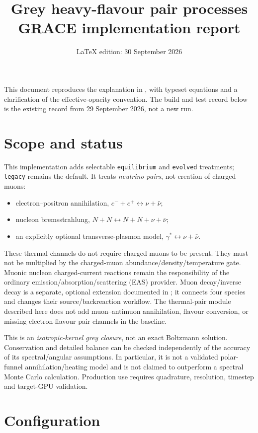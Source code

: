 \documentclass[11pt,a4paper]{article}
\title{Grey heavy-flavour pair processes\\\large GRACE implementation report}
\author{}
\date{LaTeX edition: 30 September 2026}
\newcommand{\code}[1]{\texttt{#1}}
\begin{document}
\maketitle
\noindent This document reproduces the explanation in
, with typeset equations and
a clarification of the effective-opacity convention. The build and test
record below is the existing record from 29 September 2026, not a new run.

\section{Scope and status}

This implementation adds selectable \code{equilibrium} and \code{evolved}
treatments; \code{legacy} remains the default. It treats \emph{neutrino pairs},
not creation of charged muons:
\begin{itemize}
\item electron--positron annihilation, $e^-+e^+\leftrightarrow\nu+\bar\nu$;
\item nucleon bremsstrahlung, $N+N\leftrightarrow N+N+\nu+\bar\nu$;
\item an explicitly optional transverse-plasmon model,
  $\gamma^*\leftrightarrow\nu+\bar\nu$.
\end{itemize}
These thermal channels do not require charged muons to be present. They must
not be multiplied by the charged-muon abundance/density/temperature gate.
Muonic nucleon charged-current reactions remain the responsibility of the
ordinary emission/absorption/scattering (EAS) provider. Muon decay/inverse
decay is a separate, optional extension documented in
; it connects four species and changes
their source/backreaction workflow. The thermal-pair module described here
does not add muon--antimuon annihilation, flavour conversion, or missing
electron-flavour pair channels in the baseline.

This is an \emph{isotropic-kernel grey closure}, not an exact Boltzmann
solution. Conservation and detailed balance can be checked independently of
the accuracy of its spectral/angular assumptions. In particular, it is not a
validated polar-funnel annihilation/heating model and is not claimed to
outperform a spectral Monte Carlo calculation. Production use requires
quadrature, resolution, timestep and target-GPU validation.

\section{Configuration}
\end{document}
